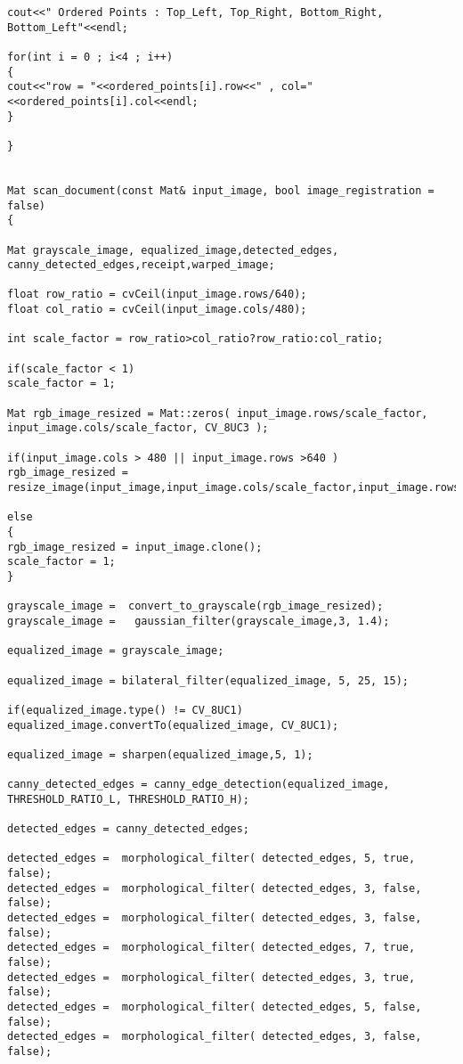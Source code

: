 \begin{lstlisting}
cout<<" Ordered Points : Top_Left, Top_Right, Bottom_Right, Bottom_Left"<<endl;

for(int i = 0 ; i<4 ; i++)
{
cout<<"row = "<<ordered_points[i].row<<" , col="<<ordered_points[i].col<<endl;
}	

}


Mat scan_document(const Mat& input_image, bool image_registration = false)
{

Mat grayscale_image, equalized_image,detected_edges, canny_detected_edges,receipt,warped_image;

float row_ratio = cvCeil(input_image.rows/640);
float col_ratio = cvCeil(input_image.cols/480);

int scale_factor = row_ratio>col_ratio?row_ratio:col_ratio;

if(scale_factor < 1)
scale_factor = 1;

Mat rgb_image_resized = Mat::zeros( input_image.rows/scale_factor, input_image.cols/scale_factor, CV_8UC3 );

if(input_image.cols > 480 || input_image.rows >640 )
rgb_image_resized = resize_image(input_image,input_image.cols/scale_factor,input_image.rows/scale_factor);

else
{
rgb_image_resized = input_image.clone();
scale_factor = 1;
}

grayscale_image =  convert_to_grayscale(rgb_image_resized);
grayscale_image =	gaussian_filter(grayscale_image,3, 1.4);

equalized_image = grayscale_image; 

equalized_image = bilateral_filter(equalized_image, 5, 25, 15);

if(equalized_image.type() != CV_8UC1)
equalized_image.convertTo(equalized_image, CV_8UC1);

equalized_image = sharpen(equalized_image,5, 1);

canny_detected_edges = canny_edge_detection(equalized_image, THRESHOLD_RATIO_L, THRESHOLD_RATIO_H);

detected_edges = canny_detected_edges;

detected_edges =  morphological_filter( detected_edges, 5, true, false);
detected_edges =  morphological_filter( detected_edges, 3, false, false);
detected_edges =  morphological_filter( detected_edges, 3, false, false);
detected_edges =  morphological_filter( detected_edges, 7, true, false);
detected_edges =  morphological_filter( detected_edges, 3, true, false);
detected_edges =  morphological_filter( detected_edges, 5, false, false);
detected_edges =  morphological_filter( detected_edges, 3, false, false);


\end{lstlisting}
